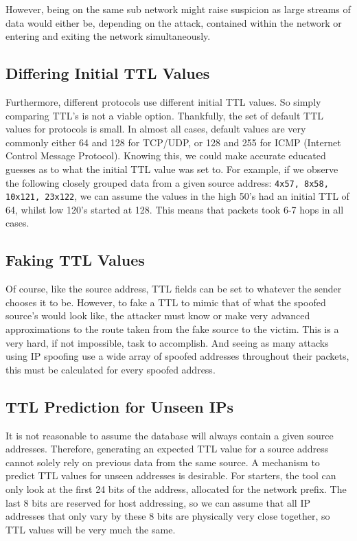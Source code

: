 \documentclass[twocolumn,10pt]{asme2ej}
\begin{document}
However, being on the same sub network might raise suspicion as large streams of data would either be, depending on the attack, contained within the network or entering and exiting the network simultaneously.

\subsection{Differing Initial TTL Values}
Furthermore, different protocols use different initial TTL values. So simply comparing TTL's is not a viable option. Thankfully, the set of default TTL values for protocols is small. In almost all cases, default values are very commonly either 64 and 128 for TCP/UDP, or 128 and 255 for ICMP (Internet Control Message Protocol). Knowing this, we could make accurate educated guesses as to what the initial TTL value was set to. For example, if we observe the following closely grouped data from a given source address: \texttt{4x57, 8x58, 10x121, 23x122}, we can assume the values in the high 50's had an initial TTL of 64, whilst low 120's started at 128. This means that packets took 6-7 hops in all cases.

\subsection{Faking TTL Values}
Of course, like the source address, TTL fields can be set to whatever the sender chooses it to be. However, to fake a TTL to mimic that of what the spoofed source's would look like, the attacker must know or make very advanced approximations to the route taken from the fake source to the victim. This is a very hard, if not impossible, task to accomplish. And seeing as many attacks using IP spoofing use a wide array of spoofed addresses throughout their packets, this must be calculated for every spoofed address.

\subsection{TTL Prediction for Unseen IPs}
It is not reasonable to assume the database will always contain a given source addresses. Therefore, generating an expected TTL value for a source address cannot solely rely on previous data from the same source. A mechanism to predict TTL values for unseen addresses is desirable. For starters, the tool can only look at the first 24 bits of the address, allocated for the network prefix. The last 8 bits are reserved for host addressing, so we can assume that all IP addresses that only vary by these 8 bits are physically very close together, so TTL values will be very much the same.
\end{document}
